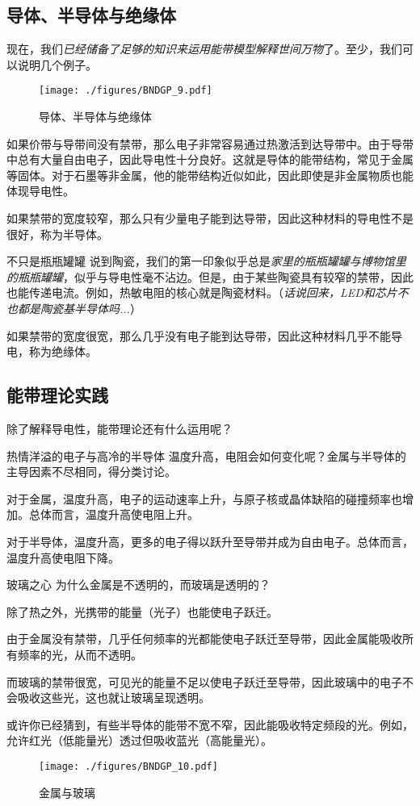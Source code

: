 \subsection{导体、半导体与绝缘体}
现在，我们\textsl{已经储备了足够的知识来运用能带模型解释世间万物}了。至少，我们可以说明几个例子。
\begin{figure}[ht]
\centering
\texttt{[image: ./figures/BNDGP\_9.pdf]}
\caption{导体、半导体与绝缘体} \label{BNDGP_fig9}
\end{figure}
如果价带与导带间没有禁带，那么电子非常容易通过热激活到达导带中。由于导带中总有大量自由电子，因此导电性十分良好。这就是导体的能带结构，常见于金属等固体。对于石墨等非金属，他的能带结构近似如此，因此即使是非金属物质也能体现导电性。

如果禁带的宽度较窄，那么只有少量电子能到达导带，因此这种材料的导电性不是很好，称为半导体。

\begin{example}{不只是瓶瓶罐罐}
说到陶瓷，我们的第一印象似乎总是\textsl{家里的瓶瓶罐罐与博物馆里的瓶瓶罐罐}，似乎与导电性毫不沾边。但是，由于某些陶瓷具有较窄的禁带，因此也能传递电流。例如，热敏电阻的核心就是陶瓷材料。（\textsl{话说回来，LED和芯片不也都是陶瓷基半导体吗...}）
\end{example}

如果禁带的宽度很宽，那么几乎没有电子能到达导带，因此这种材料几乎不能导电，称为绝缘体。

\subsection{能带理论实践}
除了解释导电性，能带理论还有什么运用呢？

\begin{example}{热情洋溢的电子与高冷的半导体}
温度升高，电阻会如何变化呢？金属与半导体的主导因素不尽相同，得分类讨论。

对于金属，温度升高，电子的运动速率上升，与原子核或晶体缺陷的碰撞频率也增加。总体而言，温度升高使电阻上升。

对于半导体，温度升高，更多的电子得以跃升至导带并成为自由电子。总体而言，温度升高使电阻下降。
\end{example}

\begin{example}{玻璃之心}
为什么金属是不透明的，而玻璃是透明的？

除了热之外，光携带的能量（光子）也能使电子跃迁。

由于金属没有禁带，几乎任何频率的光都能使电子跃迁至导带，因此金属能吸收所有频率的光，从而不透明。

而玻璃的禁带很宽，可见光的能量不足以使电子跃迁至导带，因此玻璃中的电子不会吸收这些光，这也就让玻璃呈现透明。

或许你已经猜到，有些半导体的能带不宽不窄，因此能吸收特定频段的光。例如，允许红光（低能量光）透过但吸收蓝光（高能量光）。

\begin{figure}[ht]
\centering
\texttt{[image: ./figures/BNDGP\_10.pdf]}
\caption{金属与玻璃} \label{BNDGP_fig10}
\end{figure}
\end{example}
